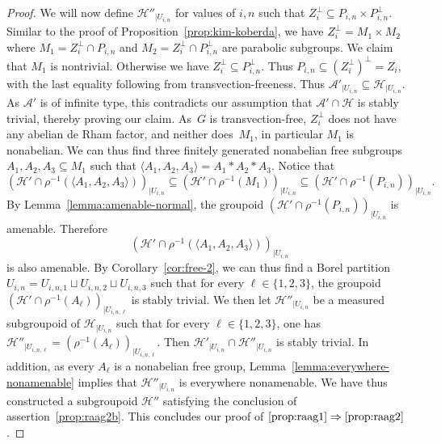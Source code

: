 \documentclass[11pt]{article}
\numberwithin{equation}{section}
\let\mathcal\mathscr
\theoremstyle{plain}
\theoremstyle{definition}
\let\dunion\sqcup
\newcommand{\cala}{\mathcal{A}}
\newcommand{\calh}{\mathcal{H}}
\begin{document}
\begin{proof}
We will now define $\calh''_{|U_{i,n}}$ for values of $i,n$ such that $Z^\perp_i\subseteq P_{i,n}\times P^\perp_{i,n}$. Similar to the proof of Proposition~\ref{prop:kim-koberda}, we have $Z^\perp_i= M_1\times M_2$ where $M_1=Z^\perp_i\cap P_{i,n}$ and $M_2=Z^\perp_i\cap P^\perp_{i,n}$ are parabolic subgroups. We claim that $M_1$ is nontrivial. Otherwise we have $Z^\perp_i\!\subseteq\! P^\perp_{i,n}$. Thus $P_{i,n}\!\subseteq\! (Z^\perp_i)^\perp=Z_i$, with the last equality following from transvection-freeness. Thus $\cala'_{|U_{i,n}}\subseteq \calh_{|U_{i,n}}$. As $\cala'$ is of infinite type, this contradicts our assumption that $\cala'\cap \calh$ is stably trivial, thereby proving our claim. As~$G$ is transvection-free, $Z^\perp_i$ does not have any abelian de Rham factor, and neither does~$M_1$, in particular $M_1$ is nonabelian. We can thus find three finitely generated nonabelian free subgroups $A_1,A_2,A_3\subseteq M_1$ such that $\langle A_1,A_2,A_3\rangle=A_1\ast A_2\ast A_3$. Notice that
\[
(\calh'\cap\rho^{-1}(\langle A_1,A_2,A_3\rangle))_{|U_{i,n}}\subseteq (\calh'\cap\rho^{-1}(M_1))_{|U_{i,n}}\subseteq (\calh'\cap\rho^{-1}(P_{i,n}))_{|U_{i,n}}.
\]
By Lemma~\ref{lemma:amenable-normal}, the groupoid $(\calh'\cap \rho^{-1}(P_{i,n}))_{|U_{i,n}}$ is amenable. Therefore
\[
(\calh'\cap\rho^{-1}(\langle A_1,A_2,A_3\rangle))_{|U_{i,n}}
\]
is also amenable. By Corollary~\ref{cor:free-2}, we can thus find a Borel partition $U_{i,n}=U_{i,n,1}\dunion U_{i,n,2}\dunion U_{i,n,3}$ such that for every $\ell\in\{1,2,3\}$, the groupoid $(\calh'\cap\rho^{-1}(A_\ell))_{|U_{i,n,\ell}}$ is stably trivial. We then let $\calh''_{|U_{i,n}}$ be a measured subgroupoid of $\calh_{|U_{i,n}}$ such that for every $\ell\in\{1,2,3\}$, one has $\calh''_{|U_{i,n,\ell}}=(\rho^{-1}(A_\ell))_{|U_{i,n,\ell}}$. Then $\calh'_{|U_{i,n}}\cap\calh''_{|U_{i,n}}$ is stably trivial. In addition, as every $A_\ell$ is a nonabelian free group, Lemma~\ref{lemma:everywhere-nonamenable} implies that $\calh''_{|U_{i,n}}$ is everywhere nonamenable. We have thus constructed a subgroupoid $\calh''$ satisfying the conclusion of assertion~\eqref{prop:raag2b}. This concludes our proof of $\eqref{prop:raag1}\Rightarrow\eqref{prop:raag2}$.


\end{proof}
\end{document}
